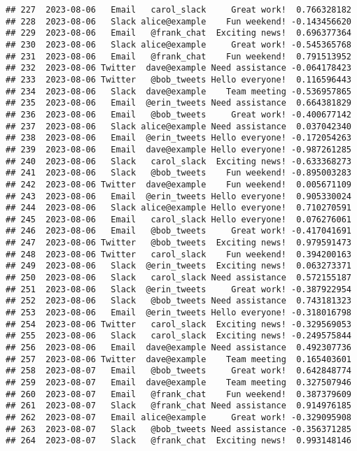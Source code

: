\documentclass[
]{article}
\begin{document}
\begin{verbatim}
## 227  2023-08-06   Email   carol_slack     Great work!  0.766328182
## 228  2023-08-06   Slack alice@example    Fun weekend! -0.143456620
## 229  2023-08-06   Email   @frank_chat  Exciting news!  0.696377364
## 230  2023-08-06   Slack alice@example     Great work! -0.545365768
## 231  2023-08-06   Email   @frank_chat    Fun weekend!  0.791513952
## 232  2023-08-06 Twitter  dave@example Need assistance -0.064178423
## 233  2023-08-06 Twitter   @bob_tweets Hello everyone!  0.116596443
## 234  2023-08-06   Slack  dave@example    Team meeting -0.536957865
## 235  2023-08-06   Email  @erin_tweets Need assistance  0.664381829
## 236  2023-08-06   Email   @bob_tweets     Great work! -0.400677142
## 237  2023-08-06   Slack alice@example Need assistance  0.037042340
## 238  2023-08-06   Email  @erin_tweets Hello everyone! -0.172054263
## 239  2023-08-06   Email  dave@example Hello everyone! -0.987261285
## 240  2023-08-06   Slack   carol_slack  Exciting news! -0.633368273
## 241  2023-08-06   Slack   @bob_tweets    Fun weekend! -0.895003283
## 242  2023-08-06 Twitter  dave@example    Fun weekend!  0.005671109
## 243  2023-08-06   Email  @erin_tweets Hello everyone!  0.905330024
## 244  2023-08-06   Slack alice@example Hello everyone!  0.710270591
## 245  2023-08-06   Email   carol_slack Hello everyone!  0.076276061
## 246  2023-08-06   Email   @bob_tweets     Great work! -0.417041691
## 247  2023-08-06 Twitter   @bob_tweets  Exciting news!  0.979591473
## 248  2023-08-06 Twitter   carol_slack    Fun weekend!  0.394200163
## 249  2023-08-06   Slack  @erin_tweets  Exciting news!  0.063273371
## 250  2023-08-06   Slack   carol_slack Need assistance  0.572155187
## 251  2023-08-06   Slack  @erin_tweets     Great work! -0.387922954
## 252  2023-08-06   Slack   @bob_tweets Need assistance  0.743181323
## 253  2023-08-06   Email  @erin_tweets Hello everyone! -0.318016798
## 254  2023-08-06 Twitter   carol_slack  Exciting news! -0.329569053
## 255  2023-08-06   Slack   carol_slack  Exciting news! -0.249575844
## 256  2023-08-06   Email  dave@example Need assistance  0.492307736
## 257  2023-08-06 Twitter  dave@example    Team meeting  0.165403601
## 258  2023-08-07   Email   @bob_tweets     Great work!  0.642848774
## 259  2023-08-07   Email  dave@example    Team meeting  0.327507946
## 260  2023-08-07   Email   @frank_chat    Fun weekend!  0.387379609
## 261  2023-08-07   Slack   @frank_chat Need assistance  0.914976185
## 262  2023-08-07   Email alice@example     Great work! -0.329095908
## 263  2023-08-07   Slack   @bob_tweets Need assistance -0.356371285
## 264  2023-08-07   Slack   @frank_chat  Exciting news!  0.993148146

\end{verbatim}
\end{document}
